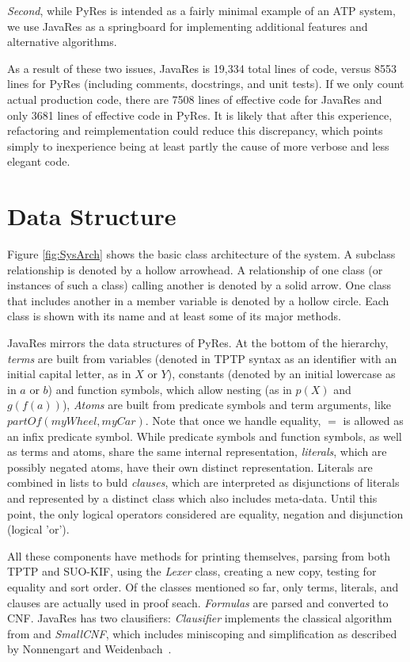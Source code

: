 \documentclass{llncs}
\begin{document}
\textit{Second}, while PyRes is intended as a fairly minimal example of an ATP system, we
use JavaRes as a springboard for implementing additional features
and alternative algorithms.

As a result of these two issues, JavaRes is 19,334 total
lines of code, versus 8553 lines for PyRes (including comments,
docstrings, and unit tests). If we only count actual production code,
there are 7508 lines of effective code for JavaRes and only 3681 lines of
effective code in PyRes.  It is likely that after this experience,
refactoring and reimplementation could reduce this
discrepancy, which points simply to inexperience being at least partly
the cause of more verbose and less elegant code.


\section{Data Structure}

Figure \ref{fig:SysArch} shows the basic class architecture of the
system. A subclass relationship is denoted by a hollow arrowhead.  A
relationship of one class (or instances of such a class) calling
another is denoted by a solid arrow.  One class that includes another
in a member variable is denoted by a hollow circle.  Each class is
shown with its name and at least some of its major methods.

JavaRes mirrors the data structures of PyRes.  At the bottom of the
hierarchy, \emph{terms} are built from variables (denoted in TPTP
syntax as an identifier with an initial capital letter, as in $X$ or
$Y$), constants (denoted by an initial lowercase as in $a$ or $b$) and
function symbols, which allow nesting (as in $p(X)$ and $g(f(a))$),
\emph{Atoms} are built from predicate symbols and term arguments, like
$partOf(myWheel,myCar)$.  Note that once we handle equality, $=$ is
allowed as an infix predicate symbol. While predicate symbols and
function symbols, as well as terms and atoms, share the same internal
representation, \emph{literals}, which are possibly negated atoms,
have their own distinct representation. Literals are combined in lists
to buld \emph{clauses}, which are interpreted as disjunctions of
literals and represented by a distinct class which also includes
meta-data.  Until this point, the only logical operators considered
are equality, negation and disjunction (logical 'or').

All these components have methods for printing themselves, parsing
from both TPTP and SUO-KIF, using the \emph{Lexer} class, creating a new
copy, testing for equality and sort order. Of the classes mentioned so
far, only terms, literals, and clauses are actually used in proof
seach.  \emph{Formulas} are parsed and converted to CNF.  JavaRes has
two clausifiers: \emph{Clausifier} implements the classical algorithm
from \cite{RN:AI-95} and \emph{SmallCNF}, which includes miniscoping
and simplification as described by Nonnengart and
Weidenbach~\cite{NW:SmallCNF-2001}.
\end{document}
